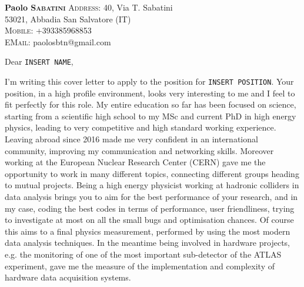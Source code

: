 \documentclass[12pt,a4paper]{article}
\date{}
\makeatletter
\renewcommand{\maketitle}{\bgroup\setlength{\parindent}{0pt}
\begin{flushleft}
  \textbf{\@title}

  \@author
\end{flushleft}\egroup
}
\makeatother
\begin{document}
{ \setlength{\parindent}{0cm}
\begin{small}
\begin{flushleft}
\begin{minipage}{0.6\textwidth}
\textbf{Paolo \textsc{Sabatini}}\newline
{\footnotesize
\textsc{Address}: \tabto*{2cm} 40, Via T. Sabatini\\
\tabto*{2cm} 53021, Abbadia San Salvatore (IT)\\
\textsc{Mobile}:\tabto*{2cm} +393385968853\\
\textsc{EMail}:\tabto*{2cm} paolosbtn@gmail.com
}
\end{minipage}
\end{flushleft}

\vspace{2cm}

Dear \texttt{\color{red!80!black}INSERT NAME},

I'm writing this cover letter to apply to the position for \texttt{\color{red!80!black}INSERT POSITION}.
Your position, in a high profile environment, looks very interesting to me and I feel to fit perfectly for this role. My entire education so far has been focused on science, starting from a scientific high school to my MSc and current PhD in high energy physics, leading to very competitive and high standard working  
experience. \\[2mm]

Leaving abroad since 2016 made me very confident in an international community, improving my communication and networking skills. Moreover working at the European Nuclear Research Center (CERN) gave me the opportunity to work in many different topics, connecting different groups heading to mutual projects. Being a high energy physicist working at hadronic colliders in data analysis brings you to aim for the best performance of your research, and in my case, coding the best codes in terms of performance, user friendliness, trying to investigate at most on all the small bugs and optimisation chances. Of course this aims to a final physics measurement, performed by using the most modern data analysis techniques. In the meantime being involved in hardware projects, e.g. the monitoring of one of the most important sub-detector of the ATLAS experiment, gave me the measure of the implementation and complexity of hardware data acquisition systems.\\[2mm]


\end{small}}
\end{document}
